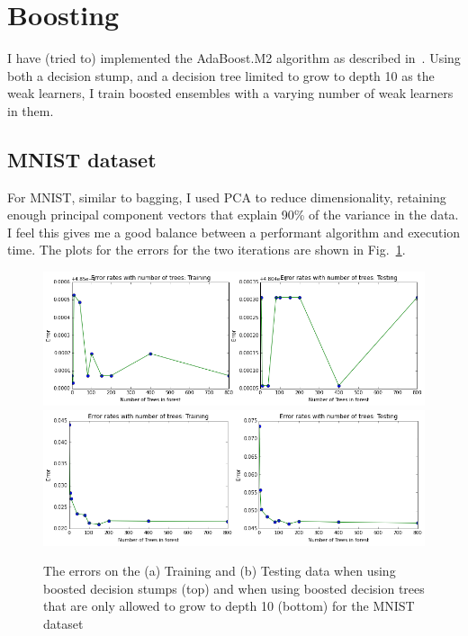 \documentclass[5pt]{article}
\begin{document}
\section{Boosting}
I have (tried to) implemented the AdaBoost.M2 algorithm as described
in~\cite{freund1996experiments}. Using both a decision stump, and a decision
tree limited to grow to depth 10 as the weak learners, I train boosted
ensembles
with a varying number of weak learners in them.

\subsection{MNIST dataset}
For MNIST, similar to bagging, I used PCA to reduce dimensionality, retaining
enough principal component vectors that explain 90\% of the variance in the
data. I feel this gives me a good balance between a performant algorithm and
execution time.  The plots for the errors for the two iterations are shown in
Fig.~\ref{fig:errorsMNISTBoosting}.

\begin{figure}
  \includegraphics[width=\textwidth]{images/boostStumpMNIST.png}
  \includegraphics[width=\textwidth]{images/boostDepthLimitedMNIST.png}
\label{fig:errorsMNISTBoosting}
\caption{The errors on the (a) Training and (b) Testing data when
  using boosted decision stumps (top) and when using boosted decision trees
that are only allowed to grow to depth 10 (bottom) for the MNIST dataset}
\end{figure}
\end{document}
